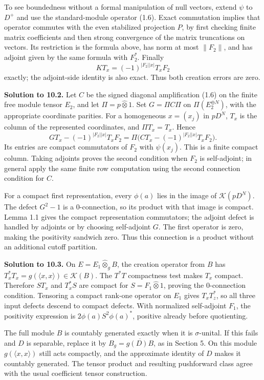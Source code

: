 \documentclass[
  11pt,
]{article}
\begin{document}
To see boundedness without a formal manipulation of null vectors, extend
\(\psi\) to \(D^+\) and use the standard-module operator (1.6). Exact
commutation implies that operator commutes with the even stabilized
projection \(P\), by first checking finite matrix coefficients and then
strong convergence of the matrix truncations on vectors. Its restriction
is the formula above, has norm at most \(\|F_2\|\), and has adjoint
given by the same formula with \(F_2^*\). Finally \[
KT_x=(-1)^{|F_2||x|}T_xF_2
\] exactly; the adjoint-side identity is also exact. Thus both creation
errors are zero.

\textbf{Solution to 10.2.} Let \(C\) be the signed diagonal
amplification (1.6) on the finite free module tensor \(E_2\), and let
\(\Pi=p\widehat\otimes1\). Set \(G=\Pi C\Pi\) on
\(\Pi(E_2^{\oplus N})\), with the appropriate coordinate parities. For a
homogeneous \(x=(x_j)\) in \(pD^N\), \(T_x\) is the column of the
represented coordinates, and \(\Pi T_x=T_x\). Hence \[
GT_x-(-1)^{|F_2||x|}T_xF_2
=\Pi\bigl(CT_x-(-1)^{|F_2||x|}T_xF_2\bigr).
\] Its entries are compact commutators of \(F_2\) with \(\psi(x_j)\).
This is a finite compact column. Taking adjoints proves the second
condition when \(F_2\) is self-adjoint; in general apply the same finite
row computation using the second connection condition for \(C\).

For a compact first representation, every \(\phi(a)\) lies in the image
of \(\mathcal K(pD^N)\). The defect \(G^2-1\) is a \(0\)-connection, so
its product with that image is compact. Lemma 1.1 gives the compact
representation commutators; the adjoint defect is handled by adjoints or
by choosing self-adjoint \(G\). The first operator is zero, making the
positivity sandwich zero. Thus this connection is a product without an
additional cutoff partition.

\textbf{Solution to 10.3.} On \(E=E_1\widehat\otimes_g B\), the creation
operator from \(B\) has
\(T_x^*T_x=g(\langle x,x\rangle)\in\mathcal K(B)\). The \(T^*T\)
compactness test makes \(T_x\) compact. Therefore \(ST_x\) and
\(T_x^*S\) are compact for \(S=F_1\widehat\otimes1\), proving the
\(0\)-connection condition. Tensoring a compact rank-one operator on
\(E_1\) gives \(T_xT_z^*\), so all three input defects descend to
compact defects. With normalized self-adjoint \(F_1\), the positivity
expression is \(2\phi(a)S^2\phi(a)^*\), positive already before
quotienting.

The full module \(B\) is countably generated exactly when it is
\(\sigma\)-unital. If this fails and \(D\) is separable, replace it by
\(B_g=\overline{g(D)B}\), as in Section 5. On this module
\(g(\langle x,x\rangle)\) still acts compactly, and the approximate
identity of \(D\) makes it countably generated. The tensor product and
resulting pushforward class agree with the usual coefficient tensor
construction.
\end{document}
